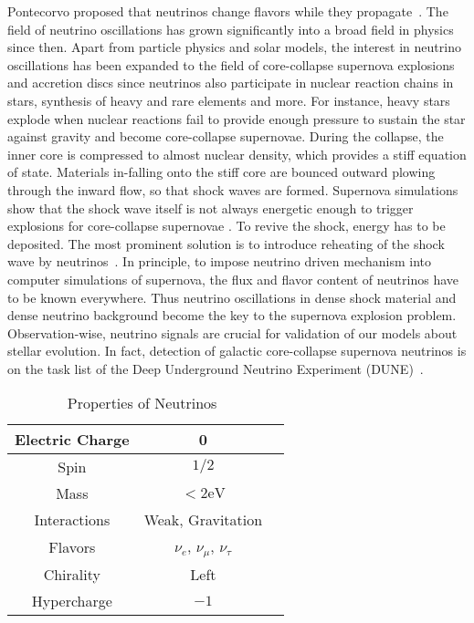 Pontecorvo proposed that neutrinos change flavors while they propagate~\cite{Pontecorvo1968}. The field of neutrino oscillations has grown significantly into a broad field in physics since then. Apart from particle physics and solar models, the interest in neutrino oscillations has been expanded to the field of core-collapse supernova explosions and accretion discs since neutrinos also participate in nuclear reaction chains in stars, synthesis of heavy and rare elements and more. For instance, heavy stars explode when nuclear reactions fail to provide enough pressure to sustain the star against gravity and become core-collapse supernovae. During the collapse, the inner core is compressed to almost nuclear density, which provides a stiff equation of state. Materials in-falling onto the stiff core are bounced outward plowing through the inward flow, so that shock waves are formed. Supernova simulations show that the shock wave itself is not always energetic enough to trigger explosions for core-collapse supernovae \cite{Janka2016b}. To revive the shock, energy has to be deposited. The most prominent solution is to introduce reheating of the shock wave by neutrinos~\cite{Janka2016b}. In principle, to impose neutrino driven mechanism into computer simulations of supernova, the flux and flavor content of neutrinos have to be known everywhere. Thus neutrino oscillations in dense shock material and dense neutrino background become the key to the supernova explosion problem. Observation-wise, neutrino signals are crucial for validation of our models about stellar evolution. In fact, detection of galactic core-collapse supernova neutrinos is on the task list of the Deep Underground Neutrino Experiment (DUNE)~\cite{Kemp2017}.

\begin{table}[ht]
\centering
 \begin{tabular}{|c | c | c|}
 \hline
  Electric Charge & 0\\
  \hline
  Spin & $1/2$ \\
\hline
 Mass & $<2\mathrm{eV}$  \\
 \hline
 Interactions & Weak, Gravitation  \\
 \hline
 Flavors & $\nu_e$, $\nu_\mu$, $\nu_\tau$ \\
 \hline
 Chirality & Left \\
 \hline
 Hypercharge & $-1$ \\
 \hline

 \end{tabular}
 \caption{Properties of Neutrinos~\cite{Patrignani:2016xqp}}
\label{table:neutrino-properties}
\end{table}


